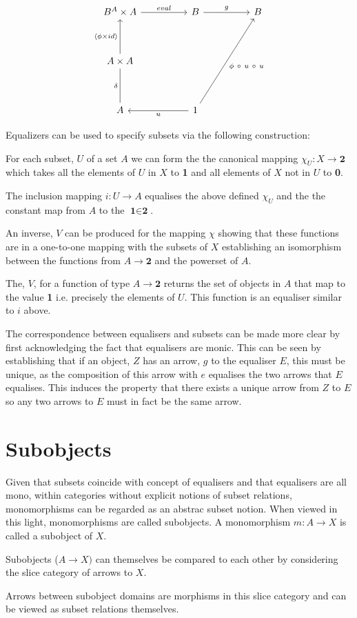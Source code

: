 \documentclass[a4paper,12pt]{article}
\begin{document}
\[\begin{tikzcd}[sep=huge]
    B^A \times A \arrow[r, "eval"]                         & B \arrow[r, "g"]
    & B \\
    A \times A \arrow[u, "\langle \phi \times id \rangle"] &
    &   \\
    A \arrow[u, "\delta", no head]                         & 1 \arrow[l, "u"]
    \arrow[ruu, "\phi \ \circ \ u \ \circ \ u"'] &  
\end{tikzcd}\]


Equalizers can be used to specify subsets via the following construction:

For each subset, $U$ of a set $A$ we can form the the canonical mapping
$\chi_{U}: X \rightarrow \textbf{2}$ which takes all the elements of $U$ in
$X$ to \textbf{1} and all elements of $X$ not in $U$ to \textbf{0}.

The inclusion mapping $i: U \rightarrow A$ equalises the above defined
$\chi_{U}$ and the the constant map from $A$ to the $\textbf{1} \in \textbf{2}$.

An inverse, $V$ can be produced for the mapping $\chi$ showing that these
functions are in a one-to-one mapping with the subsets of $X$ establishing an
isomorphism between the functions from $A \rightarrow \textbf{2}$ and the
powerset of $A$.

The, $V$, for a function of type $A \rightarrow \textbf{2}$ returns the set of
objects in $A$ that map to the value \textbf{1} i.e. precisely the elements of
$U$. This function is an equaliser similar to $i$ above.

The correspondence between equalisers and subsets can be made more clear by
first acknowledging the fact that equalisers are monic. This can be seen by
establishing that if an object, $Z$ has an arrow, $g$ to the equaliser $E$, this
must be unique, as the composition of this arrow with $e$ equalises the two
arrows that $E$ equalises. This induces the property that there exists a unique
arrow from $Z$ to $E$ so any two arrows to $E$ must in fact be the same arrow.

\section{Subobjects}

Given that subsets coincide with concept of equalisers and that equalisers are
all mono, within categories without explicit notions of subset relations,
monomorphisms can be regarded as an abstrac subset notion. When viewed in this
light, monomorphisms are called subobjects. A monomorphism $m: A \rightarrow X$
is called a subobject of $X$.

Subobjects ($A \rightarrow X)$ can themselves be compared to each other by considering the
 slice category of arrows to $X$.

Arrows between subobject domains are morphisms in this slice category and can be
viewed as subset relations themselves.
\end{document}
